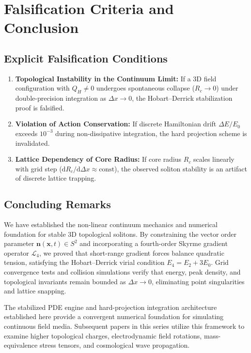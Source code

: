 \documentclass[11pt,a4paper]{article}
\begin{document}
	\section{Falsification Criteria and Conclusion}
	\label{sec:falsification}
	
	\subsection{Explicit Falsification Conditions}
	\begin{enumerate}
		\item \textbf{Topological Instability in the Continuum Limit:} If a 3D field configuration with $Q_H \neq 0$ undergoes spontaneous collapse ($R_c \to 0$) under double-precision integration as $\Delta x \to 0$, the Hobart--Derrick stabilization proof is falsified.
		\item \textbf{Violation of Action Conservation:} If discrete Hamiltonian drift $\Delta E / E_0$ exceeds $10^{-3}$ during non-dissipative integration, the hard projection scheme is invalidated.
		\item \textbf{Lattice Dependency of Core Radius:} If core radius $R_c$ scales linearly with grid step ($\mathrm{d}R_c / \mathrm{d}\Delta x \approx \text{const}$), the observed soliton stability is an artifact of discrete lattice trapping.
	\end{enumerate}
	
\subsection{Concluding Remarks}
We have established the non-linear continuum mechanics and numerical foundation for stable 3D topological solitons. By constraining the vector order parameter $\mathbf{n}(\mathbf{x}, t) \in S^2$ and incorporating a fourth-order Skyrme gradient operator $\mathcal{L}_4$, we proved that short-range gradient forces balance quadratic tension, satisfying the Hobart--Derrick virial condition $E_4 = E_2 + 3E_0$. Grid convergence tests and collision simulations verify that energy, peak density, and topological invariants remain bounded as $\Delta x \to 0$, eliminating point singularities and lattice snapping.

The stabilized PDE engine and hard-projection integration architecture established here provide a convergent numerical foundation for simulating continuous field media. Subsequent papers in this series utilize this framework to examine higher topological charges, electrodynamic field rotations, mass-equivalence stress tensors, and cosmological wave propagation.
	
\end{document}
